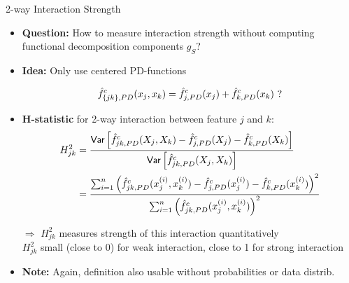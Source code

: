 \documentclass[10pt,compress,t,notes=noshow, xcolor=table]{beamer}
\begin{document}
\begin{frame}{2-way Interaction Strength}
\begin{itemize}[<+->]
    \item \textbf{Question:} How to measure interaction strength without computing functional decomposition components $g_S$?
    \item \textbf{Idea:} Only use centered PD-functions

    $$
    \hat{f}_{\{jk\}, PD}^c(x_j, x_k)
            = \hat{f}^c_{j, PD}(x_j) + \hat{f}^c_{k, PD}(x_k) \text{ ?}
    $$
    
    \item \textbf{H-statistic} for 2-way interaction between feature $j$ and $k$:
    \begin{align*}
    H^2_{jk}
    & = \frac{
        \mathsf{Var} \left[ \hat{f}^c_{jk,PD}(X_j, X_k) - \hat{f}^c_{j, PD}(X_j) - \hat{f}^c_{k, PD}(X_k) \right]
    }{ \mathsf{Var} \left[ \hat{f}^c_{jk,PD}(X_j, X_k) \right] } \\
    & = \frac{
        \sum_{i=1}^n \left( \hat{f}^c_{jk,PD}(x_j^{(i)}, x_k^{(i)})
        - \hat{f}^c_{j, PD}(x_j^{(i)}) - \hat{f}^c_{k, PD}(x_k^{(i)}) \right)^2
    }{
        \sum_{i=1}^n \left( \hat{f}^c_{jk,PD}(x_j^{(i)}, x_k^{(i)}) \right)^2
    }
    \end{align*}
    \item[$\Rightarrow$]
    $H^2_{jk}$ measures strength of this interaction quantitatively \\
    $H^2_{jk}$ small (close to 0) for weak interaction, close to 1 for strong interaction
    \item \textbf{Note:} Again, definition also usable without probabilities or data distrib.
\end{itemize}




\end{frame}
\end{document}

